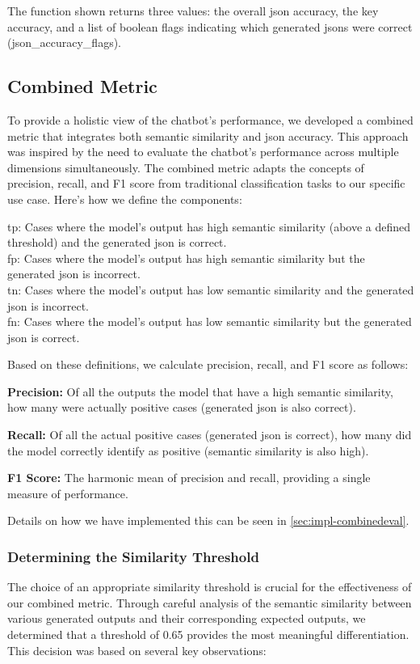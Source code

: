 The function shown returns three values: the overall \gls{json} accuracy, the key accuracy, and a list of boolean flags indicating which generated \glspl{json} were correct (json\_accuracy\_flags).


\subsection{Combined Metric}

To provide a holistic view of the chatbot's performance, we developed a combined metric that integrates both semantic similarity and \gls{json} accuracy. This approach was inspired by the need to evaluate the chatbot's performance across multiple dimensions simultaneously.
The combined metric adapts the concepts of precision, recall, and F1 score from traditional classification tasks to our specific use case. Here's how we define the components:

\gls{tp}: Cases where the model's output has high semantic similarity (above a defined threshold) and the generated \gls{json} is correct.\\
\gls{fp}: Cases where the model's output has high semantic similarity but the generated \gls{json} is incorrect.\\
\gls{tn}: Cases where the model's output has low semantic similarity and the  generated \gls{json} is incorrect.\\
\gls{fn}: Cases where the model's output has low semantic similarity but the generated \gls{json} is correct.

Based on these definitions, we calculate precision, recall, and F1 score as follows:

\textbf{Precision:} Of all the outputs the model that have a high semantic similarity, how many were actually positive cases (generated \gls{json} is also correct).

\textbf{Recall:} Of all the actual positive cases (generated \gls{json} is correct), how many did the model correctly identify as positive (semantic similarity is also high).

\textbf{F1 Score:} The harmonic mean of precision and recall, providing a single measure of performance.

Details on how we have implemented this can be seen in \cref{sec:impl-combinedeval}.

\subsubsection{Determining the Similarity Threshold}
The choice of an appropriate similarity threshold is crucial for the effectiveness of our combined metric. Through careful analysis of the semantic similarity between various generated outputs and their corresponding expected outputs, we determined that a threshold of 0.65 provides the most meaningful differentiation. This decision was based on several key observations:

